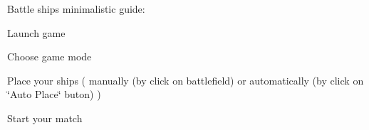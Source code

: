 Battle ships minimalistic guide\+:


\begin{DoxyItemize}
\item Launch game
\item Choose game mode
\item Place your ships ( manually (by click on battlefield) or automatically (by click on \char`\"{}\+Auto Place\char`\"{} buton) )
\item Start your match 
\end{DoxyItemize}